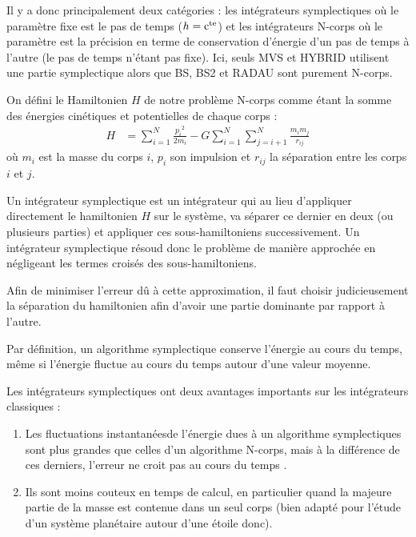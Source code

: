 Il y a donc principalement deux catégories : les intégrateurs symplectiques où le paramètre fixe est le pas de temps ($h=\mathrm{c^{te}}$) et les intégrateurs N-corps où le paramètre est la précision en terme de conservation d'énergie d'un pas de temps à l'autre (le pas de temps n'étant pas fixe). Ici, seuls MVS et HYBRID utilisent une partie symplectique alors que BS, BS2 et RADAU sont purement N-corps.

\bigskip

On défini le Hamiltonien $H$ de notre problème N-corps comme étant la somme des énergies cinétiques et potentielles de chaque corps : 
\begin{align}
H &= \sum_{i=1}^N\frac{{p_i}^2}{2m_i} -G\sum_{i=1}^N\sum_{j=i+1}^N\frac{m_im_j}{r_{ij}}
\end{align}
où $m_i$ est la masse du corps $i$, $p_i$ son impulsion et $r_{ij}$ la séparation entre les corps $i$ et $j$.

Un intégrateur symplectique est un intégrateur qui au lieu d'appliquer directement le hamiltonien $H$ sur le système, va séparer ce dernier en deux (ou plusieurs parties) et appliquer ces sous-hamiltoniens successivement. Un intégrateur symplectique résoud donc le problème de manière approchée en négligeant les termes croisés des sous-hamiltoniens.

Afin de minimiser l'erreur dû à cette approximation, il faut choisir judicieusement la séparation du hamiltonien afin d'avoir une partie dominante par rapport à l'autre.

Par définition, un algorithme symplectique conserve l'énergie au cours du temps, même si l'énergie fluctue au cours du temps autour d'une valeur moyenne. 

Les intégrateurs symplectiques ont deux avantages importants sur les intégrateurs classiques : 
\begin{enumerate}
\item Les fluctuations \og instantanées\fg de l'énergie dues à un algorithme symplectiques sont plus grandes que celles d'un algorithme N-corps, mais à la différence de ces derniers, l'erreur ne croit pas au cours du temps .
\item Ils sont moins couteux en temps de calcul, en particulier quand la majeure partie de la masse est contenue dans un seul corps (bien adapté pour l'étude d'un système planétaire autour d'une étoile donc).
\end{enumerate}

